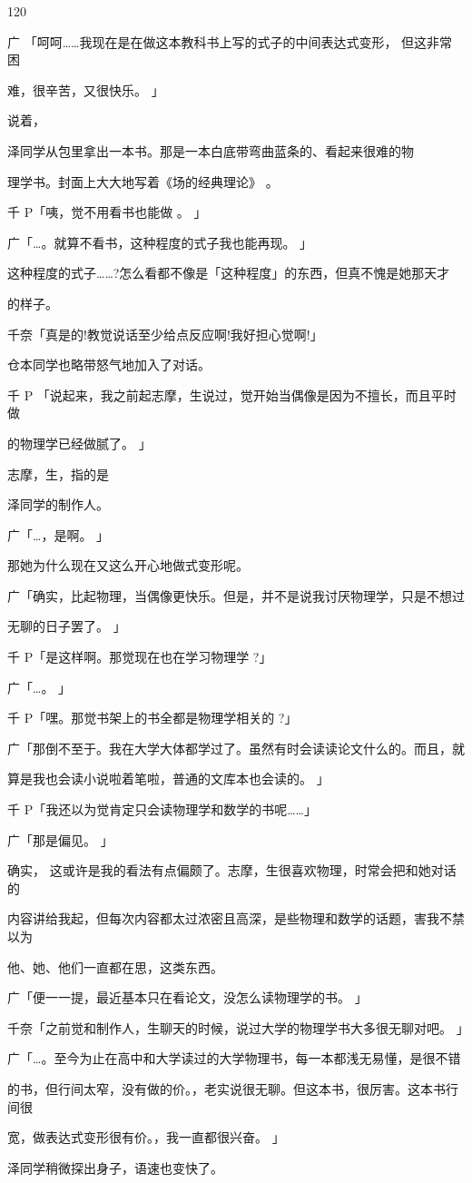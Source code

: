 120\par
广 「呵呵……我现在是在做这本教科书上写的式子的中间表达式变形， 但这非常困\par
难，很辛苦，又很快乐。 」\par
说着，\par
泽同学从包里拿出一本书。那是一本白底带弯曲蓝条的、看起来很难的物\par
理学书。封面上大大地写着《场的经典理论》 。\par
千 P「咦，觉不用看书也能做 。 」\par
广「…。就算不看书，这种程度的式子我也能再现。 」\par
这种程度的式子……?怎么看都不像是「这种程度」的东西，但真不愧是她那天才\par
的样子。\par
千奈「真是的!教觉说话至少给点反应啊!我好担心觉啊!」\par
仓本同学也略带怒气地加入了对话。\par
千 P 「说起来，我之前起志摩，生说过，觉开始当偶像是因为不擅长，而且平时做\par
的物理学已经做腻了。 」\par
志摩，生，指的是\par
泽同学的制作人。\par
广「…，是啊。 」\par
那她为什么现在又这么开心地做式变形呢。\par
广「确实，比起物理，当偶像更快乐。但是，并不是说我讨厌物理学，只是不想过\par
无聊的日子罢了。 」\par
千 P「是这样啊。那觉现在也在学习物理学 ?」\par
广「…。 」\par
千 P「嘿。那觉书架上的书全都是物理学相关的 ?」\par
广「那倒不至于。我在大学大体都学过了。虽然有时会读读论文什么的。而且，就\par
算是我也会读小说啦着笔啦，普通的文库本也会读的。 」\par
千 P「我还以为觉肯定只会读物理学和数学的书呢……」\par
广「那是偏见。 」\par
确实， 这或许是我的看法有点偏颇了。志摩，生很喜欢物理，时常会把和她对话的\par
内容讲给我起，但每次内容都太过浓密且高深，是些物理和数学的话题，害我不禁以为\par
他、她、他们一直都在思，这类东西。\par
广「便一一提，最近基本只在看论文，没怎么读物理学的书。 」\par
千奈「之前觉和制作人，生聊天的时候，说过大学的物理学书大多很无聊对吧。 」\par
广「…。至今为止在高中和大学读过的大学物理书，每一本都浅无易懂，是很不错\par
的书，但行间太窄，没有做的价。，老实说很无聊。但这本书，很厉害。这本书行间很\par
宽，做表达式变形很有价。，我一直都很兴奋。 」\par
泽同学稍微探出身子，语速也变快了。\par

